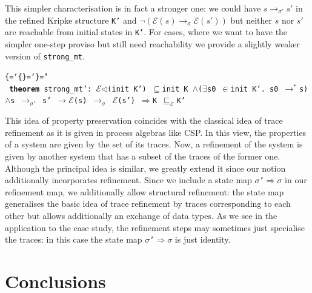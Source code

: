 \documentclass{llncs}
\newenvironment{ttbox}{\begin{alltt}\ttbraces\small\tt}%
                      {\end{alltt}}
\def\ttbraces{\let\.=\nobreak\chardef\{=`\{\chardef\}=`\}\chardef\|=`\\}
\newcommand\ttand{\mbox{{$\land$}}}
\newcommand\ttfun{\mbox{{$\Rightarrow$}}}
\newcommand\ttimp{\mbox{{$\longrightarrow$}}}
\newcommand\ttexists{\mbox{{$\exists$}}}
\newcommand\ttin{\mbox{{$\in$}}}
\newcommand\ttImp{\mbox{{$\Longrightarrow$}}}
\newcommand\ttrelIstar{\mbox{{$\to^*$}}}
\newcommand\ttrel[1]{\mbox{{$\to_{#1}$}}}
\newcommand\ttsubseteq{\mbox{{$\subseteq$}}}
\newcommand\ttsigma{\mbox{{$\sigma$}}}
\newcommand\ttmref[1]{\mbox{{$\sqsubseteq_{#1}$}}}
\newcommand\ttmeref{\ttmref{\mathcal{E}}}
\newcommand\ttecal{\mbox{$\mathcal{E}$}}
\newcommand\ttimg{\mbox{$\triangleleft$}}
\begin{document}
This simpler characterisation is in fact a stronger one: we could have $s \ttrel{\sigma'} s'$ 
in the refined Kripke structure \texttt{K'} and $\neg(\ttecal(s) \ttrel{\sigma} \ttecal(s'))$
but neither $s$ nor $s'$ are reachable from initial states in \texttt{K'}.
For cases, where we want to have the simpler one-step proviso but still need 
reachability we provide a slightly weaker version of \texttt{strong\_mt}.
\begin{ttbox}
{\bf{theorem}} strong_mt':  
\ttecal\ttimg(init K') \ttsubseteq init K \ttand (\ttexists s0 \ttin init K'. s0  \ttrelIstar s)
 \ttand s \ttrel{\sigma'} s' \ttimp \ttecal(s) \ttrel{\sigma} \ttecal(s') \ttImp K \ttmeref K'
\end{ttbox}

This idea of property preservation coincides with the classical idea of
trace refinement as it is given in process algebras like CSP. In this view,
the properties of a system are given by the set of its traces. Now, a refinement
of the system is given by another system that has a subset of the traces of the 
former one.
Although the principal idea is similar, we greatly extend it since our notion
additionally incorporates refinement. Since we include a state map 
\texttt{\ttsigma'\ttfun \ttsigma} in our refinement map, we additionally
allow structural refinement: the state map generalises the basic idea of
trace refinement by traces corresponding to each other but allows additionally
an exchange of data types. 
As we see in the application to the case study, the refinement steps may
sometimes just specialise the traces: in this case the state map 
\texttt{\ttsigma'\ttfun \ttsigma} is just identity. 


\section{Conclusions}
\label{sec:concl}



\end{document}

